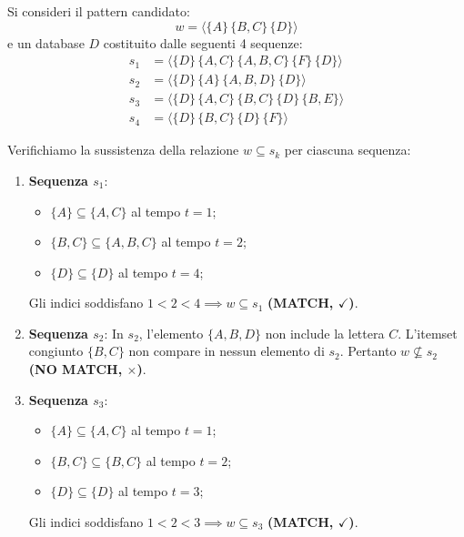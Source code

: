 \begin{example}
Si consideri il pattern candidato:
\begin{equation}
w = \langle \{A\} \, \{B, C\} \, \{D\} \rangle
\end{equation}
e un database $D$ costituito dalle seguenti 4 sequenze:
\begin{align*}
s_1 &= \langle \{D\} \, \{A, C\} \, \{A, B, C\} \, \{F\} \, \{D\} \rangle \\
s_2 &= \langle \{D\} \, \{A\} \, \{A, B, D\} \, \{D\} \rangle \\
s_3 &= \langle \{D\} \, \{A, C\} \, \{B, C\} \, \{D\} \, \{B, E\} \rangle \\
s_4 &= \langle \{D\} \, \{B, C\} \, \{D\} \, \{F\} \rangle
\end{align*}

Verifichiamo la sussistenza della relazione $w \subseteq s_k$ per ciascuna sequenza:
\begin{enumerate}
    \item \textbf{Sequenza $s_1$}:
    \begin{itemize}[noitemsep]
        \item $\{A\} \subseteq \{A, C\}$ al tempo $t = 1$;
        \item $\{B, C\} \subseteq \{A, B, C\}$ al tempo $t = 2$;
        \item $\{D\} \subseteq \{D\}$ al tempo $t = 4$;
    \end{itemize}
    Gli indici soddisfano $1 < 2 < 4 \implies w \subseteq s_1$ \textbf{(MATCH, $\checkmark$)}.
    
    \item \textbf{Sequenza $s_2$}:
    In $s_2$, l'elemento $\{A, B, D\}$ non include la lettera $C$. L'itemset congiunto $\{B, C\}$ non compare in nessun elemento di $s_2$.
    Pertanto $w \not\subseteq s_2$ \textbf{(NO MATCH, $\times$)}.
    
    \item \textbf{Sequenza $s_3$}:
    \begin{itemize}[noitemsep]
        \item $\{A\} \subseteq \{A, C\}$ al tempo $t = 1$;
        \item $\{B, C\} \subseteq \{B, C\}$ al tempo $t = 2$;
        \item $\{D\} \subseteq \{D\}$ al tempo $t = 3$;
    \end{itemize}
    Gli indici soddisfano $1 < 2 < 3 \implies w \subseteq s_3$ \textbf{(MATCH, $\checkmark$)}.
    

\end{enumerate}
\end{example}
